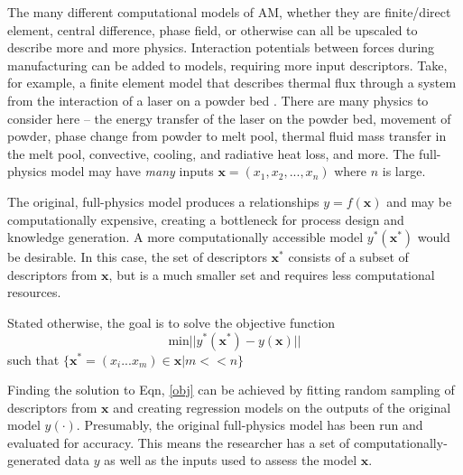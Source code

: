 The many different computational models of AM, whether they are finite/direct element, central difference, phase field, or otherwise can all be upscaled to describe more and more physics.  Interaction potentials between forces during manufacturing can be added to models, requiring more input descriptors. Take, for example, a finite element model that describes thermal flux through a system from the interaction of a laser on a powder bed \cite{Khairallah2016}. There are many physics to consider here -- the energy transfer of the laser on the powder bed, movement of powder, phase change from powder to melt pool, thermal fluid mass transfer in the melt pool, convective, cooling, and radiative heat loss, and more. The full-physics model may have \textit{many} inputs $\mathbf{x} = (x_1,x_2,...,x_n)$ where $n$ is large.

The original, full-physics model produces a relationships $y = f(\mathbf{x})$ and may be computationally expensive, creating a bottleneck for process design and knowledge generation. A more computationally accessible model $y^*(\mathbf{x^*})$ would be desirable. In this case, the set of descriptors $\mathbf{x^*}$ consists of a subset of descriptors from $\mathbf{x}$, but is a much smaller set and requires less computational resources. 

Stated otherwise, the goal is to solve the objective function
\begin{equation}
	\text{min} ||y^*{(\mathbf{x^*})} - y(\mathbf{x})||
	\label{obj}
\end{equation}
such that $\{\mathbf{x^*} = \left(x_i...x_m\right) \in \mathbf{x} | m << n\}$

Finding the solution to Eqn, \ref{obj} can be achieved by fitting random sampling of descriptors from $\mathbf{x}$ and creating regression models on the outputs of the original model $y(\cdot)$. Presumably, the original full-physics model has been run and evaluated for accuracy. This means the researcher has a set of computationally-generated data $y$ as well as the inputs used to assess the model $\mathbf{x}$. 

